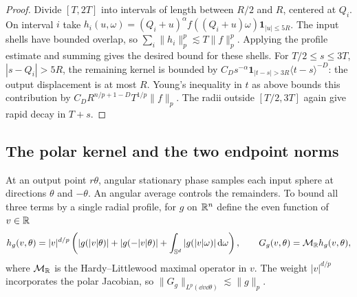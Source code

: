 \begin{proof}
Divide $[T,2T]$ into intervals of length between $R/2$ and $R$, centered at
$Q_i$. On interval $i$ take
$h_i(u,\omega)=(Q_i+u)^\alpha f((Q_i+u)\omega)\mathbf1_{|u|\le5R}$.
The input shells have bounded overlap, so
$\sum_i\|h_i\|_p^p\lesssim T\|f\|_p^p$. Applying the profile estimate
and summing gives the desired bound for these shells.
For $T/2\le s\le3T$, $|s-Q_i|>5R$, the remaining kernel is bounded by
$C_D s^{-\alpha}\mathbf1_{|t-s|>3R}\langle t-s\rangle^{-D}$:
the output displacement is at most $R$. Young's inequality in $t$ as
above bounds this contribution by $C_D R^{n/p+1-D}T^{1/p}\|f\|_p$.
The radii outside $[T/2,3T]$ again give rapid decay in $T+s$.
\end{proof}

\subsection{The polar kernel and the two endpoint norms}

At an output point $r\theta$, angular stationary phase samples each input
sphere at directions $\theta$ and $-\theta$. An angular average controls
the remainders. To bound all three terms by a single radial profile, for
$g$ on $\mathbb R^n$ define the even function of $v\in\mathbb R$
\[
 h_g(v,\theta)=|v|^{d/p}\left(|g(|v|\theta)|+|g(-|v|\theta)|
       +\int_{\mathbb S^d}|g(|v|\omega)|\,\mathrm d\omega\right),\qquad
 G_g(v,\theta)=\mathcal M_{\mathbb R}h_g(v,\theta),
\]
where $\mathcal M_{\mathbb R}$ is the Hardy--Littlewood maximal operator
in $v$. The weight $|v|^{d/p}$ incorporates the polar Jacobian, so
$\|G_g\|_{L^p(\dd v\dd\theta)}\lesssim\|g\|_p$.

